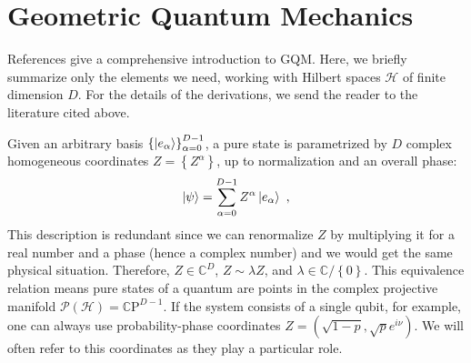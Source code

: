 \documentclass[draft,nofootinbib,pre,twocolumn,showpacs,showkeys,preprintnumbers,floatfix]{revtex4-1}
\newcommand{\1}{\mathbbm{1}}
\begin{document}






\section{Geometric Quantum Mechanics}
\label{sec:GQM}

References
\cite{STROCCHI1966,Miel68,Kibble1979,Heslot1985,Page87,And90,Gibbons1992,Ashtekar1995,Ashtekar1999,Brody2001,Bengtsson2017,Carinena2007,Chruscinski2006,Marmo2010,Avron2020,Pastorello2015,Pastorello2015a,Pastorello2016,Clemente-Gallardo2013}
give a comprehensive introduction to GQM. Here, we briefly summarize only the
elements we need, working with Hilbert spaces $\mathcal{H}$ of finite dimension $D$.
For the details of the derivations, we send the reader to the literature cited above.

Given an arbitrary basis $\left\{\ket{e_\alpha} \right\}_{\alpha=0}^{D-1}$, a pure state is
parametrized by $D$ complex homogeneous coordinates $Z = \left\{      Z^\alpha\right\}$, up to
normalization and an overall phase:
\begin{align*}
\ket{\psi} = \sum_{\alpha=0}^{D-1} Z^\alpha \ket{e_\alpha}
  ~,
\end{align*}
This description is redundant since we can renormalize $Z$ by multiplying it for a real number
and a phase (hence a complex number) and we would get the same physical situation. Therefore, 
$Z \in \mathbb{C}^{D}$, $Z \sim \lambda Z$, and $\lambda \in \mathbb{C}/\left\{ 0\right\}$. This equivalence 
relation means pure states of a quantum are points in the complex projective manifold $\mathcal{P}\left(
\mathcal{H} \right)=\mathbb{C}\mathrm{P}^{D-1}$. If the system consists of a single qubit, for
example, one can always use probability-phase coordinates $Z = (\sqrt{1-p},\sqrt{p} e^{i\nu})$.
We will often refer to this coordinates as they play a particular role.
\end{document}
